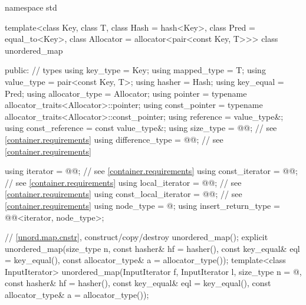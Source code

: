 %
\begin{codeblock}
namespace std {
  template<class Key,
           class T,
           class Hash = hash<Key>,
           class Pred = equal_to<Key>,
           class Allocator = allocator<pair<const Key, T>>>
  class unordered_map {
  public:
    // types
    using key_type             = Key;
    using mapped_type          = T;
    using value_type           = pair<const Key, T>;
    using hasher               = Hash;
    using key_equal            = Pred;
    using allocator_type       = Allocator;
    using pointer              = typename allocator_traits<Allocator>::pointer;
    using const_pointer        = typename allocator_traits<Allocator>::const_pointer;
    using reference            = value_type&;
    using const_reference      = const value_type&;
    using size_type            = @@; // see \ref{container.requirements}
    using difference_type      = @@; // see \ref{container.requirements}

    using iterator             = @@; // see \ref{container.requirements}
    using const_iterator       = @@; // see \ref{container.requirements}
    using local_iterator       = @@; // see \ref{container.requirements}
    using const_local_iterator = @@; // see \ref{container.requirements}
    using node_type            = @\unspec@;
    using insert_return_type   = @@<iterator, node_type>;

    // \ref{unord.map.cnstr}, construct/copy/destroy
    unordered_map();
    explicit unordered_map(size_type n,
                           const hasher& hf = hasher(),
                           const key_equal& eql = key_equal(),
                           const allocator_type& a = allocator_type());
    template<class InputIterator>
      unordered_map(InputIterator f, InputIterator l,
                    size_type n = @\seebelow@,
                    const hasher& hf = hasher(),
                    const key_equal& eql = key_equal(),
                    const allocator_type& a = allocator_type());

}}
\end{codeblock}
